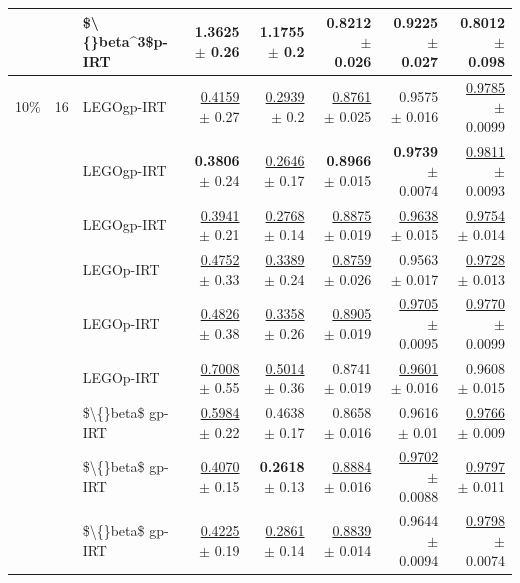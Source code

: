 \begin{longtable}{llp{}rrrrr}
 &  & \$\textbackslash\{\}beta\textasciicircum{}3\$p-IRT & 1.3625 {\scriptsize $\pm$ 0.26} & 1.1755 {\scriptsize $\pm$ 0.2} & 0.8212 {\scriptsize $\pm$ 0.026} & 0.9225 {\scriptsize $\pm$ 0.027} & 0.8012 {\scriptsize $\pm$ 0.098} \\
\midrule
10\% & 16 & LEGOgp-IRT & \underline{0.4159} {\scriptsize $\pm$ 0.27} & \underline{0.2939} {\scriptsize $\pm$ 0.2} & \underline{0.8761} {\scriptsize $\pm$ 0.025} & 0.9575 {\scriptsize $\pm$ 0.016} & \underline{0.9785} {\scriptsize $\pm$ 0.0099} \\
 &  & LEGOgp-IRT & \textbf{0.3806} {\scriptsize $\pm$ 0.24} & \underline{0.2646} {\scriptsize $\pm$ 0.17} & \textbf{0.8966} {\scriptsize $\pm$ 0.015} & \textbf{0.9739} {\scriptsize $\pm$ 0.0074} & \underline{0.9811} {\scriptsize $\pm$ 0.0093} \\
 &  & LEGOgp-IRT & \underline{0.3941} {\scriptsize $\pm$ 0.21} & \underline{0.2768} {\scriptsize $\pm$ 0.14} & \underline{0.8875} {\scriptsize $\pm$ 0.019} & \underline{0.9638} {\scriptsize $\pm$ 0.015} & \underline{0.9754} {\scriptsize $\pm$ 0.014} \\
 &  & LEGOp-IRT & \underline{0.4752} {\scriptsize $\pm$ 0.33} & \underline{0.3389} {\scriptsize $\pm$ 0.24} & \underline{0.8759} {\scriptsize $\pm$ 0.026} & 0.9563 {\scriptsize $\pm$ 0.017} & \underline{0.9728} {\scriptsize $\pm$ 0.013} \\
 &  & LEGOp-IRT & \underline{0.4826} {\scriptsize $\pm$ 0.38} & \underline{0.3358} {\scriptsize $\pm$ 0.26} & \underline{0.8905} {\scriptsize $\pm$ 0.019} & \underline{0.9705} {\scriptsize $\pm$ 0.0095} & \underline{0.9770} {\scriptsize $\pm$ 0.0099} \\
 &  & LEGOp-IRT & \underline{0.7008} {\scriptsize $\pm$ 0.55} & \underline{0.5014} {\scriptsize $\pm$ 0.36} & 0.8741 {\scriptsize $\pm$ 0.019} & \underline{0.9601} {\scriptsize $\pm$ 0.016} & 0.9608 {\scriptsize $\pm$ 0.015} \\
 &  & \$\textbackslash\{\}beta\$ gp-IRT & \underline{0.5984} {\scriptsize $\pm$ 0.22} & 0.4638 {\scriptsize $\pm$ 0.17} & 0.8658 {\scriptsize $\pm$ 0.016} & 0.9616 {\scriptsize $\pm$ 0.01} & \underline{0.9766} {\scriptsize $\pm$ 0.009} \\
 &  & \$\textbackslash\{\}beta\$ gp-IRT & \underline{0.4070} {\scriptsize $\pm$ 0.15} & \textbf{0.2618} {\scriptsize $\pm$ 0.13} & \underline{0.8884} {\scriptsize $\pm$ 0.016} & \underline{0.9702} {\scriptsize $\pm$ 0.0088} & \underline{0.9797} {\scriptsize $\pm$ 0.011} \\
 &  & \$\textbackslash\{\}beta\$ gp-IRT & \underline{0.4225} {\scriptsize $\pm$ 0.19} & \underline{0.2861} {\scriptsize $\pm$ 0.14} & \underline{0.8839} {\scriptsize $\pm$ 0.014} & 0.9644 {\scriptsize $\pm$ 0.0094} & \underline{0.9798} {\scriptsize $\pm$ 0.0074} \\

\end{longtable}
